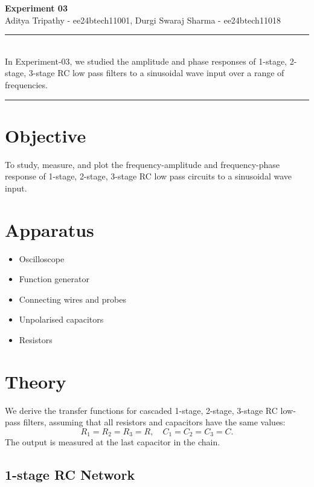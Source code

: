 \documentclass[a4paper,12pt]{article}
\renewenvironment{abstract}
{\par\noindent\textbf{\abstractname}\ \ignorespaces \\}
{\par\noindent\medskip}
\begin{document}
\pagestyle{fancy}
\thispagestyle{empty}
\fancyhead[L]{}
\renewcommand*{\thefootnote}{\fnsymbol{footnote}}
\begin{center}
  \Large{\textbf{Experiment 03}}
  \vspace{0.4cm}
  \normalsize
  \\ Aditya Tripathy - ee24btech11001, Durgi Swaraj Sharma - ee24btech11018\\
  \medskip
  \normalsize
\end{center}
{\color{gray}\hrule}
\vspace{0.4cm}
\begin{abstract}
  In Experiment-03, we studied the amplitude and phase responses of 1-stage, 2-stage, 3-stage RC low pass filters to a sinusoidal wave input over a range of frequencies.
\end{abstract}
{\color{gray}\hrule}
\medskip
\section{Objective}
To study, measure, and plot the frequency-amplitude and frequency-phase response of 1-stage, 2-stage, 3-stage RC low pass circuits to a sinusoidal wave input. 
\section{Apparatus}
\begin{itemize}
  \item Oscilloscope
  \item Function generator
  \item Connecting wires and probes
  \item Unpolarised capacitors
  \item Resistors
\end{itemize}
\section{Theory}

We derive the transfer functions for cascaded 1-stage, 2-stage, 3-stage RC low-pass filters, assuming that all resistors and capacitors have the same values:  
\[
R_1 = R_2 = R_3 = R, \quad C_1 = C_2 = C_3 = C.
\]
The output is measured at the last capacitor in the chain.

\subsection{1-stage RC Network}
\end{document}

